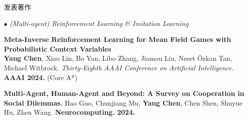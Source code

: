 \documentclass{resume} %
\begin{document}
\begin{rSection}{发表著作}
\begin{rSubsection}{\large\em $\bullet$ (Multi-agent) Reinforcement Learning \& Imitation Learning}{}{}{}
	\item {\bf Meta-Inverse Reinforcement Learning for Mean Field Games with Probabilistic Context Variables}\\
		\textbf{\bf Yang Chen}, Xiao Lin, Bo Yan, Libo Zhang, Jiamou Liu, Neset \"{O}zkan Tan, Michael Witbrock. {\em Thirty-Eighth AAAI Conference on Artificial Intelligence.} \textbf{AAAI 2024.} (Core A*)\\
	\item {\bf Multi-Agent, Human-Agent and Beyond: A Survey on Cooperation in Social Dilemmas.} Hao Guo, Chunjiang Mu, \textbf{Yang Chen}, Chen Shen, Shuyue Hu, Zhen Wang. \textbf{Neurocomputing. 2024.}
	

\end{rSubsection}
\end{rSection}
\end{document}
